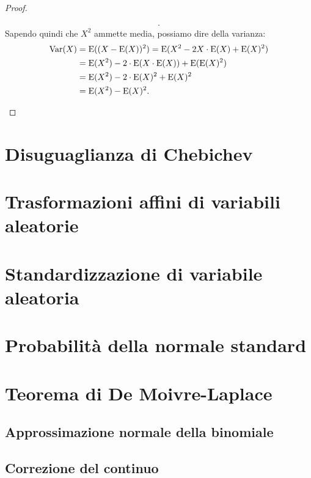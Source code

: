 \begin{proof}
\begin{enumerate}
\begin{align*}
                .\end{align*}
                Sapendo quindi che $X^2$ ammette media, possiamo dire della varianza:
                \begin{align*}
                    \text{Var}(X) &= \text{E}((X - \text{E}(X))^2) = \text{E}(X^2 - 2X\cdot\text{E}(X) + \text{E}(X)^2) \\
                                  &= \text{E}(X^2) - 2\cdot\text{E}(X\cdot\text{E}(X)) + \text{E}(\text{E}(X)^2) \\
                                  &= \text{E}(X^2) - 2\cdot\text{E}(X)^2 + \text{E}(X)^2 \\
                                  &= \text{E}(X^2) - \text{E}(X)^2 \qedhere
                .\end{align*}
            \end{enumerate}
        \end{proof}
    \section{Disuguaglianza di Chebichev}
        \begin{defn}
            
        \end{defn}
    \section{Trasformazioni affini di variabili aleatorie}
    \section{Standardizzazione di variabile aleatoria}
    \section{Probabilità della normale standard}
    \section{Teorema di De Moivre-Laplace}
        \subsection{Approssimazione normale della binomiale}
        \subsection*{Correzione del continuo}
